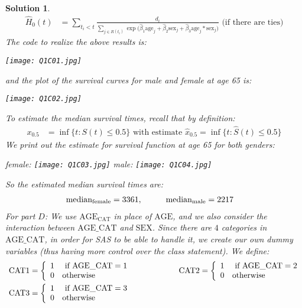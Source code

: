 \documentclass[11pt]{article}
\newtheorem{sol}{Solution}
\begin{document}
\begin{sol}
\begin{align*}
		\hat{H}_0(t) &= \sum_{t_i < t}\frac{d_i}{\sum_{j \in R(t_i)}\exp\Big(\hat{\beta}_1\text{age}_j + \hat{\beta}_2\text{sex}_j + \hat{\beta}_3\text{age}_j*\text{sex}_j\Big)} \text{ (if there are ties)}
	\end{align*}
	The code to realize the above results is:
	\begin{center}
		\texttt{[image: Q1C01.jpg]}
	\end{center}
	and the plot of the survival curves for male and female at age 65 is:
	\begin{center}
		\texttt{[image: Q1C02.jpg]}
	\end{center}
	To estimate the median survival times, recall that by definition:
	\begin{align*}
		x_{0.5} &= \inf\{t: S(t) \leq 0.5\} \text{ with estimate } \hat{x}_{0.5} = \inf\{t: \hat{S}(t) \leq 0.5\}
	\end{align*}
	We print out the estimate for survival function at age 65 for both genders:
	\begin{center}
		female: \texttt{[image: Q1C03.jpg]} male: \texttt{[image: Q1C04.jpg]}
	\end{center}
	So the estimated median survival times are:
	\begin{align*}
		\text{median}_{\text{female}} &= 3361, \hskip 1cm \text{median}_{\text{male}} = 2217
	\end{align*}
	For part $D$:\vskip 2mm
	We use $\text{AGE}_\text{CAT}$ in place of $\text{AGE}$, and we also consider the interaction between $\text{AGE}\_\text{CAT}$ and $\text{SEX}$. Since there are $4$ categories in $\text{AGE}\_\text{CAT}$, in order for SAS to be able to handle it, we create our own dummy variables (thus having more control over the class statement).\vskip 2mm
	We define:
	\begin{align*}
		&\ \text{CAT}1 = \left\{\begin{array}{ll} 1& \text{ if } \text{AGE}\_\text{CAT} = 1\\ 0& \text{otherwise} \end{array}\right.\hskip 2cm \text{CAT}2 = \left\{\begin{array}{ll} 1& \text{ if } \text{AGE}\_\text{CAT} = 2\\ 0& \text{otherwise} \end{array}\right.\\
		&\ \text{CAT}3 = \left\{\begin{array}{ll} 1& \text{ if } \text{AGE}\_\text{CAT} = 3\\ 0& \text{otherwise} \end{array}\right.

\end{align*}
\end{sol}
\end{document}
